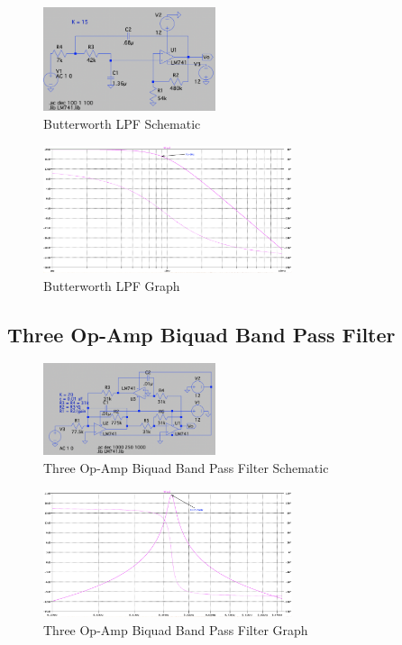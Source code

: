 \documentclass[CMPE]{KGCOEReport}
\begin{document}
\begin{figure}[H]
	\centering
  	\includegraphics[width=0.45\textwidth]{Screenshots/q6_schematic}  
	\caption{Butterworth LPF Schematic}
	\label{q6_schematic}
\end{figure}

\begin{figure}[H]
	\centering
  	\includegraphics[width=0.65\textwidth]{Screenshots/q6_graph}  
	\caption{Butterworth LPF Graph}
	\label{q6_graph}
\end{figure}

\subsection*{Three Op-Amp Biquad Band Pass Filter}

\begin{figure}[H]
	\centering
  	\includegraphics[width=0.45\textwidth]{Screenshots/q7_schematic}  
	\caption{Three Op-Amp Biquad Band Pass Filter Schematic}
	\label{q6_schematic}
\end{figure}

\begin{figure}[H]
	\centering
  	\includegraphics[width=0.65\textwidth]{Screenshots/q7_graph}  
	\caption{Three Op-Amp Biquad Band Pass Filter Graph}
	\label{q7_graph}
\end{figure}
\end{document}
